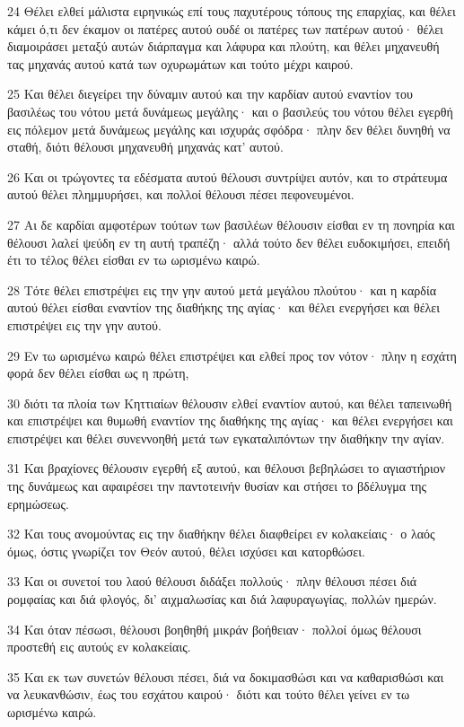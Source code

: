 \par 24 Θέλει ελθεί μάλιστα ειρηνικώς επί τους παχυτέρους τόπους της επαρχίας, και θέλει κάμει ό,τι δεν έκαμον οι πατέρες αυτού ουδέ οι πατέρες των πατέρων αυτού· θέλει διαμοιράσει μεταξύ αυτών διάρπαγμα και λάφυρα και πλούτη, και θέλει μηχανευθή τας μηχανάς αυτού κατά των οχυρωμάτων και τούτο μέχρι καιρού.
\par 25 Και θέλει διεγείρει την δύναμιν αυτού και την καρδίαν αυτού εναντίον του βασιλέως του νότου μετά δυνάμεως μεγάλης· και ο βασιλεύς του νότου θέλει εγερθή εις πόλεμον μετά δυνάμεως μεγάλης και ισχυράς σφόδρα· πλην δεν θέλει δυνηθή να σταθή, διότι θέλουσι μηχανευθή μηχανάς κατ' αυτού.
\par 26 Και οι τρώγοντες τα εδέσματα αυτού θέλουσι συντρίψει αυτόν, και το στράτευμα αυτού θέλει πλημμυρήσει, και πολλοί θέλουσι πέσει πεφονευμένοι.
\par 27 Αι δε καρδίαι αμφοτέρων τούτων των βασιλέων θέλουσιν είσθαι εν τη πονηρία και θέλουσι λαλεί ψεύδη εν τη αυτή τραπέζη· αλλά τούτο δεν θέλει ευδοκιμήσει, επειδή έτι το τέλος θέλει είσθαι εν τω ωρισμένω καιρώ.
\par 28 Τότε θέλει επιστρέψει εις την γην αυτού μετά μεγάλου πλούτου· και η καρδία αυτού θέλει είσθαι εναντίον της διαθήκης της αγίας· και θέλει ενεργήσει και θέλει επιστρέψει εις την γην αυτού.
\par 29 Εν τω ωρισμένω καιρώ θέλει επιστρέψει και ελθεί προς τον νότον· πλην η εσχάτη φορά δεν θέλει είσθαι ως η πρώτη,
\par 30 διότι τα πλοία των Κηττιαίων θέλουσιν ελθεί εναντίον αυτού, και θέλει ταπεινωθή και επιστρέψει και θυμωθή εναντίον της διαθήκης της αγίας· και θέλει ενεργήσει και επιστρέψει και θέλει συνεννοηθή μετά των εγκαταλιπόντων την διαθήκην την αγίαν.
\par 31 Και βραχίονες θέλουσιν εγερθή εξ αυτού, και θέλουσι βεβηλώσει το αγιαστήριον της δυνάμεως και αφαιρέσει την παντοτεινήν θυσίαν και στήσει το βδέλυγμα της ερημώσεως.
\par 32 Και τους ανομούντας εις την διαθήκην θέλει διαφθείρει εν κολακείαις· ο λαός όμως, όστις γνωρίζει τον Θεόν αυτού, θέλει ισχύσει και κατορθώσει.
\par 33 Και οι συνετοί του λαού θέλουσι διδάξει πολλούς· πλην θέλουσι πέσει διά ρομφαίας και διά φλογός, δι' αιχμαλωσίας και διά λαφυραγωγίας, πολλών ημερών.
\par 34 Και όταν πέσωσι, θέλουσι βοηθηθή μικράν βοήθειαν· πολλοί όμως θέλουσι προστεθή εις αυτούς εν κολακείαις.
\par 35 Και εκ των συνετών θέλουσι πέσει, διά να δοκιμασθώσι και να καθαρισθώσι και να λευκανθώσιν, έως του εσχάτου καιρού· διότι και τούτο θέλει γείνει εν τω ωρισμένω καιρώ.
